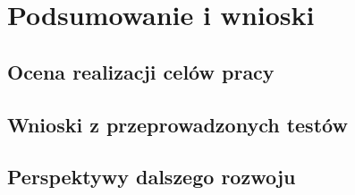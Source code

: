 \chapter{Podsumowanie i wnioski}
\label{chap:podsumowanie}

\section{Ocena realizacji celów pracy}

\section{Wnioski z przeprowadzonych testów}

\section{Perspektywy dalszego rozwoju}
